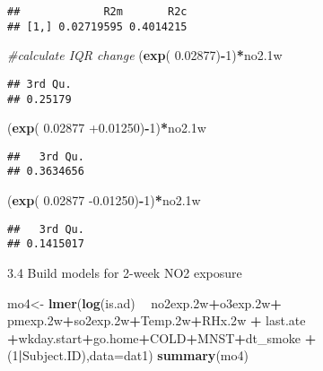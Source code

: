 \documentclass[12pt,]{article}
\newenvironment{Shaded}{\begin{snugshade}}{\end{snugshade}}
\newcommand{\CommentTok}[1]{\textcolor[rgb]{0.56,0.35,0.01}{\textit{#1}}}
\newcommand{\DataTypeTok}[1]{\textcolor[rgb]{0.13,0.29,0.53}{#1}}
\newcommand{\DecValTok}[1]{\textcolor[rgb]{0.00,0.00,0.81}{#1}}
\newcommand{\FloatTok}[1]{\textcolor[rgb]{0.00,0.00,0.81}{#1}}
\newcommand{\KeywordTok}[1]{\textcolor[rgb]{0.13,0.29,0.53}{\textbf{#1}}}
\newcommand{\NormalTok}[1]{#1}
\newcommand{\OperatorTok}[1]{\textcolor[rgb]{0.81,0.36,0.00}{\textbf{#1}}}
\newcommand{\StringTok}[1]{\textcolor[rgb]{0.31,0.60,0.02}{#1}}
\begin{document}
\begin{verbatim}
##             R2m       R2c
## [1,] 0.02719595 0.4014215
\end{verbatim}

\begin{Shaded}
\begin{Highlighting}[]
\CommentTok{#calculate IQR change}
\NormalTok{(}\KeywordTok{exp}\NormalTok{( }\FloatTok{0.02877}\NormalTok{)}\OperatorTok{-}\DecValTok{1}\NormalTok{)}\OperatorTok{*}\NormalTok{no2}\FloatTok{.1}\NormalTok{w}
\end{Highlighting}
\end{Shaded}

\begin{verbatim}
## 3rd Qu. 
## 0.25179
\end{verbatim}

\begin{Shaded}
\begin{Highlighting}[]
\NormalTok{(}\KeywordTok{exp}\NormalTok{( }\FloatTok{0.02877} \FloatTok{+0.01250}\NormalTok{)}\OperatorTok{-}\DecValTok{1}\NormalTok{)}\OperatorTok{*}\NormalTok{no2}\FloatTok{.1}\NormalTok{w}
\end{Highlighting}
\end{Shaded}

\begin{verbatim}
##   3rd Qu. 
## 0.3634656
\end{verbatim}

\begin{Shaded}
\begin{Highlighting}[]
\NormalTok{(}\KeywordTok{exp}\NormalTok{( }\FloatTok{0.02877} \FloatTok{-0.01250}\NormalTok{)}\OperatorTok{-}\DecValTok{1}\NormalTok{)}\OperatorTok{*}\NormalTok{no2}\FloatTok{.1}\NormalTok{w}
\end{Highlighting}
\end{Shaded}

\begin{verbatim}
##   3rd Qu. 
## 0.1415017
\end{verbatim}

3.4 Build models for 2-week NO2 exposure

\begin{Shaded}
\begin{Highlighting}[]
\NormalTok{mo4<-}\StringTok{ }\KeywordTok{lmer}\NormalTok{(}\KeywordTok{log}\NormalTok{(is.ad) }\OperatorTok{~}\StringTok{ }\NormalTok{no2exp}\FloatTok{.2}\NormalTok{w}\OperatorTok{+}\NormalTok{o3exp}\FloatTok{.2}\NormalTok{w}\OperatorTok{+}\StringTok{ }\NormalTok{pmexp}\FloatTok{.2}\NormalTok{w}\OperatorTok{+}\NormalTok{so2exp}\FloatTok{.2}\NormalTok{w}\OperatorTok{+}\NormalTok{Temp}\FloatTok{.2}\NormalTok{w}\OperatorTok{+}\NormalTok{RHx}\FloatTok{.2}\NormalTok{w }\OperatorTok{+}\StringTok{ }\NormalTok{last.ate }\OperatorTok{+}\NormalTok{wkday.start}\OperatorTok{+}\NormalTok{go.home}\OperatorTok{+}\NormalTok{COLD}\OperatorTok{+}\NormalTok{MNST}\OperatorTok{+}\NormalTok{dt_smoke }\OperatorTok{+}\NormalTok{(}\DecValTok{1}\OperatorTok{|}\NormalTok{Subject.ID),}\DataTypeTok{data=}\NormalTok{dat1)}
\KeywordTok{summary}\NormalTok{(mo4)}
\end{Highlighting}
\end{Shaded}
\end{document}
